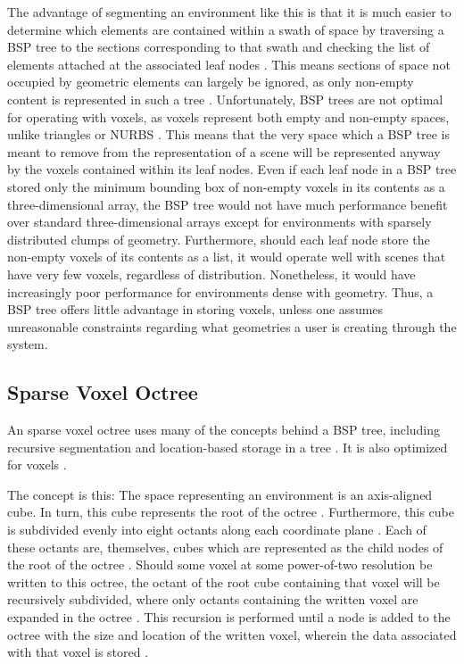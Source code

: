 \documentclass[onecolumn, draftclsnofoot,10pt, compsoc]{IEEEtran}
\begin{document}
The advantage of segmenting an environment like this is that it is much easier to determine which elements are contained within a swath of space by traversing a BSP tree to the sections corresponding to that swath and checking the list of elements attached at the associated leaf nodes \cite{5}.
This means sections of space not occupied by geometric elements can largely be ignored, as only non-empty content is represented in such a tree \cite{5}.
Unfortunately, BSP trees are not optimal for operating with voxels, as voxels represent both empty and non-empty spaces, unlike triangles or NURBS \cite{1}.
This means that the very space which a BSP tree is meant to remove from the representation of a scene will be represented anyway by the voxels contained within its leaf nodes.
Even if each leaf node in a BSP tree stored only the minimum bounding box of non-empty voxels in its contents as a three-dimensional array, the BSP tree would not have much performance benefit over standard three-dimensional arrays except for environments with sparsely distributed clumps of geometry.
Furthermore, should each leaf node store the non-empty voxels of its contents as a list, it would operate well with scenes that have very few voxels, regardless of distribution. Nonetheless, it would have increasingly poor performance for environments dense with geometry. 
Thus, a BSP tree offers little advantage in storing voxels, unless one assumes unreasonable constraints regarding what geometries a user is creating through the system.


\subsection{Sparse Voxel Octree}

An sparse voxel octree uses many of the concepts behind a BSP tree, including recursive segmentation and location-based storage in a tree \cite{3}.
It is also optimized for voxels \cite{3}.

The concept is this: The space representing an environment is an axis-aligned cube. In turn, this cube represents the root of the octree \cite{3}.
Furthermore, this cube is subdivided evenly into eight octants along each coordinate plane \cite{3}.
Each of these octants are, themselves, cubes which are represented as the child nodes of the root of the octree \cite{3}.
Should some voxel at some power-of-two resolution be written to this octree, the octant of the root cube containing that voxel will be recursively subdivided, where only octants containing the written voxel are expanded in the octree \cite{3}. 
This recursion is performed until a node is added to the octree with the size and location of the written voxel, wherein the data associated with that voxel is stored \cite{3}.
\end{document}

